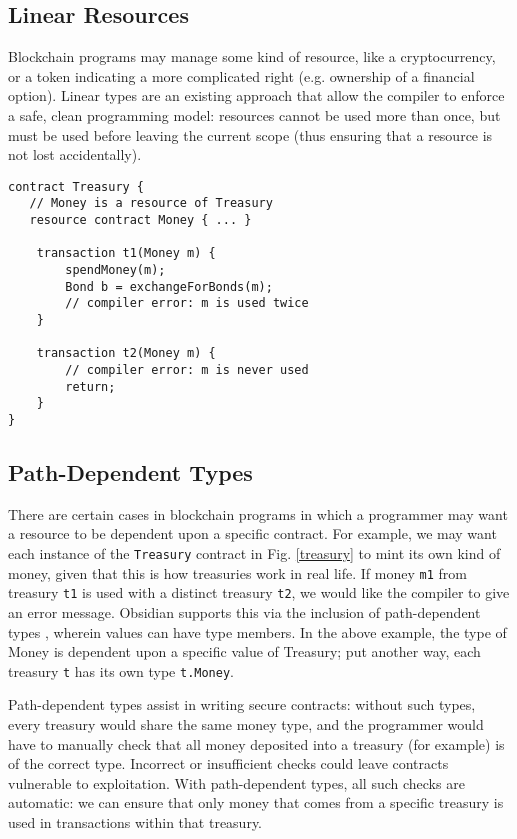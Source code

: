 \documentclass[sigplan,10pt,review]{acmart}\settopmatter{printfolios=true}
\begin{document}
\subsection{Linear Resources}

Blockchain programs may manage some kind of resource, like a cryptocurrency, or a token 
indicating a more complicated right (e.g. ownership of a financial option). Linear types \cite{Wadler} are an existing approach that allow the compiler to
enforce a safe, clean programming model: resources cannot be used more than once, but must be 
used before leaving the current scope (thus ensuring that a resource is not lost accidentally). 

\begin{lstlisting}[caption={Linear resources in Obsidian}, captionpos = b, label = treasury]
contract Treasury {
   // Money is a resource of Treasury
   resource contract Money { ... }

    transaction t1(Money m) {
        spendMoney(m);
        Bond b = exchangeForBonds(m);
        // compiler error: m is used twice
    }

    transaction t2(Money m) {
        // compiler error: m is never used
        return;
    }
}
\end{lstlisting}

\subsection{Path-Dependent Types}

There are certain cases in blockchain programs in which a programmer may want a resource to
be dependent upon a specific contract. For example, we may want each instance of the 
\texttt{\small{Treasury}} contract in Fig. \ref{treasury} to mint its own kind of money, given that this is how treasuries work in real life. If money \texttt{\small{m1}} from treasury \texttt{\small{t1}} is used with a distinct treasury \texttt{\small{t2}}, we would like the compiler to give an error message. Obsidian supports this via the inclusion of path-dependent types \cite{Amin}, wherein values can have type members. In the 
above example, the type of Money is dependent upon a specific value of Treasury; put another way, 
each treasury \texttt{\small{t}} has its own type \texttt{\small{t.Money}}. 

Path-dependent types assist in writing secure contracts: without such types, every
treasury would share the same money type, and the programmer would have to manually check 
that all money deposited into a treasury (for example) is of the correct type. Incorrect or insufficient 
checks could leave contracts vulnerable to exploitation. With path-dependent types, all such checks 
are automatic: we can ensure that only money that comes from a specific treasury is used in 
transactions within that treasury. 
\end{document}
